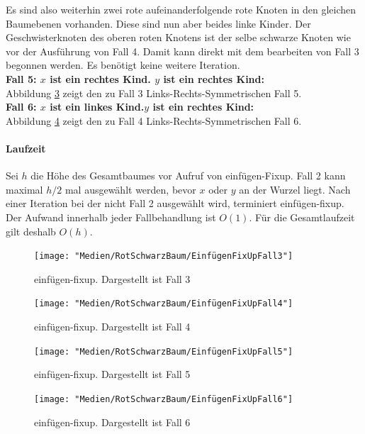 \documentclass[a4paper,12pt]{article}
\begin{document}
\noindent Es sind also weiterhin zwei rote aufeinanderfolgende rote Knoten in den gleichen Baumebenen vorhanden. Diese sind nun aber beides linke Kinder. Der Geschwisterknoten des oberen roten Knotens ist der selbe schwarze Knoten wie vor der Ausführung von Fall 4. Damit kann direkt mit dem bearbeiten von Fall 3 begonnen werden. Es benötigt keine weitere Iteration.\\

\noindent\textbf{Fall 5: $x$ ist ein rechtes Kind. $y$ ist ein rechtes Kind: }\\ 
	Abbildung \ref{fig:EinfügenFixUpFall5} zeigt den zu Fall 3 Links-Rechts-Symmetrischen Fall 5.\\
\noindent\textbf{Fall 6:  $x$ ist ein linkes Kind.$y$ ist ein rechtes Kind: }\\ 
    Abbildung \ref{fig:EinfügenFixUpFall6} zeigt den zu Fall 4 Links-Rechts-Symmetrischen Fall 6.\\


\paragraph{Laufzeit}
\noindent  Sei $h$ die Höhe des Gesamtbaumes vor Aufruf von einfügen-Fixup. Fall 2 kann maximal $h / 2$ mal ausgewählt werden, bevor $x$ oder $y$ an der Wurzel liegt. Nach einer Iteration bei der nicht Fall 2 ausgewählt wird, terminiert einfügen-fixup. Der Aufwand innerhalb jeder Fallbehandlung ist $O(1)$. Für die Gesamtlaufzeit gilt deshalb $\mathit{O(h)}$.
\begin{figure}[H]
	\centering
	\texttt{[image: "Medien/RotSchwarzBaum/EinfügenFixUpFall3"]}
	\caption{einfügen-fixup. Dargestellt ist Fall 3  }
	\label{fig:EinfügenFixUpFall3}
\end{figure}

\begin{figure}[h]
	\centering
	\texttt{[image: "Medien/RotSchwarzBaum/EinfügenFixUpFall4"]}
	\caption{einfügen-fixup. Dargestellt ist Fall 4  }
	\label{fig:EinfügenFixUpFall4}
\end{figure}

\begin{figure}[H]
	\centering
	\texttt{[image: "Medien/RotSchwarzBaum/EinfügenFixUpFall5"]}
	\caption{einfügen-fixup. Dargestellt ist Fall 5  }
	\label{fig:EinfügenFixUpFall5}
\end{figure}
\begin{figure}[H]
	\centering
	\texttt{[image: "Medien/RotSchwarzBaum/EinfügenFixUpFall6"]}
	\caption{einfügen-fixup. Dargestellt ist Fall 6  }
	\label{fig:EinfügenFixUpFall6}
\end{figure}   
\end{document}
